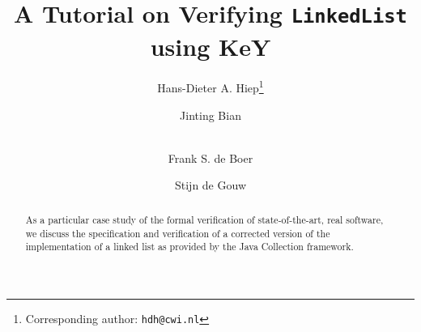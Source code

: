 \documentclass[runningheads]{llncs}
\begin{document}
\title{A Tutorial on Verifying \texttt{LinkedList} using KeY}

\author{{Hans-Dieter} A. Hiep\footnote{Corresponding author: \texttt{hdh@cwi.nl}}\and Jinting Bian\and\\
Frank S. de Boer\and Stijn de Gouw}


\maketitle

\begin{abstract}
As a particular case study of the formal verification of state-of-the-art, real  software, we discuss the specification and verification of a corrected version of the implementation of a linked list as provided by the Java Collection framework.
\end{abstract}









%
%
%
%







%


\newpage



\appendix

%


%
\end{document}
